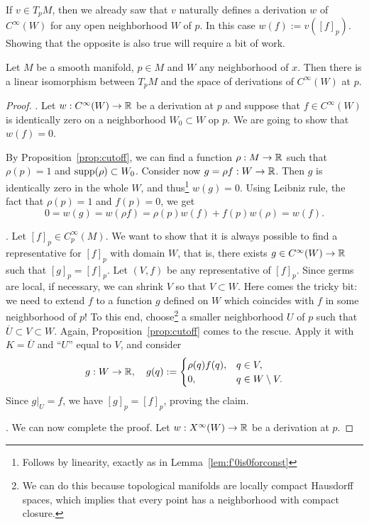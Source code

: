 If $v\in T_p M$, then we already saw that $v$ naturally defines a derivation $w$ of $C^\infty(W)$ for any open neighborhood $W$ of $p$.
In this case $w(f) := v([f]_p)$.
Showing that the opposite is also true will require a bit of work.

\begin{prop}
    Let $M$ be a smooth manifold, $p\in M$ and $W$ any neighborhood of $x$.
    Then there is a linear isomorphism between $T_p M$ and the space of derivations of $C^\infty(W)$ at $p$.
\end{prop}
\begin{proof}
    . Let $w:C^\infty(W) \to\mathbb{R}$ be a derivation at $p$ and suppose that $f\in C^\infty(W)$ is identically zero on a neighborhood $W_0\subset W$ op $p$. We are going to show that $w(f)=0$.

    By Proposition~\ref{prop:cutoff}, we can find a function $\rho:M\to\mathbb{R}$ such that $\rho(p)=1$ and $\operatorname{supp}(\rho) \subset W_0$. Consider now $g = \rho f : W \to \mathbb{R}$. Then $g$ is identically zero in the whole $W$, and thus\footnote{Follows by linearity, exactly as in Lemma~\ref{lem:f'0is0forconst}} $w(g) = 0$. Using Leibniz rule, the fact that $\rho(p)=1$ and $f(p) = 0$, we get
    \begin{equation}
        0 = w(g) = w(\rho f) = \rho(p) w(f) + f(p)w(\rho) = w(f).
    \end{equation}

    . Let $[f]_p\in C_p^\infty(M)$. We want to show that it is always possible to find a representative for $[f]_p$ with domain $W$, that is, there exists $g\in C^\infty(W)\to\mathbb{R}$ such that $[g]_p = [f]_p$.
    Let $(V, f)$ be any representative of $[f]_p$.
    Since germs are local, if necessary, we can shrink $V$ so that $V\subset W$.
    Here comes the tricky bit: we need to extend $f$ to a function $g$ defined on $W$ which coincides with $f$ in some neighborhood of $p$!
    To this end, choose\footnote{We can do this because topological manifolds are locally compact Hausdorff spaces, which implies that every point has a neighborhood with compact closure.} a smaller neighborhood $U$ of $p$ such that $\overline{U}\subset V\subset W$.
    Again, Proposition~\ref{prop:cutoff} comes to the rescue. Apply it with $K=\overline{U}$ and ``$U$'' equal to $V$, and consider
    \begin{equation}
        g:W\to\mathbb{R}, \quad
        g(q) := \begin{cases}
            \rho(q)f(q), & q\in V,\\
            0, & q \in W\setminus V.
        \end{cases}
    \end{equation}
    Since $g|_U = f$, we have $[g]_p = [f]_p$, proving the claim.

    . We can now complete the proof.
    Let $w:X^\infty(W) \to\mathbb{R}$ be a derivation at $p$.
\end{proof}

